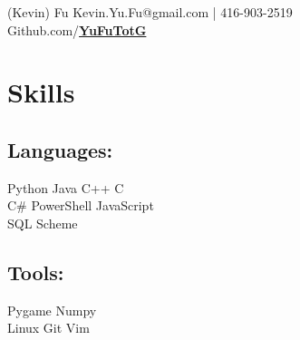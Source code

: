 \documentclass[letterpaper]{kevin-resume} %
\begin{document}


 {(Kevin) Fu} { %
	Kevin.Yu.Fu@gmail.com | 416-903-2519 \\ %
	Github.com/\href{https://github.com/YuFuTotG} {\textbf{YuFuTotG}} %
}


\begin{minipage}[t]{0.30\textwidth} %


\section{Skills}

\subsection{Languages:}
Python \textbullet{}
Java \textbullet{}
C++ \textbullet{} 
C \\
C\# \textbullet{}
PowerShell \textbullet{}
JavaScript \\
SQL \textbullet{} 
Scheme

\sectionspace %

\subsection{Tools:}
Pygame \textbullet{}
Numpy \\
Linux \textbullet{}
Git \textbullet{}
Vim

\sectionspace %




\end{minipage}
\end{document}
